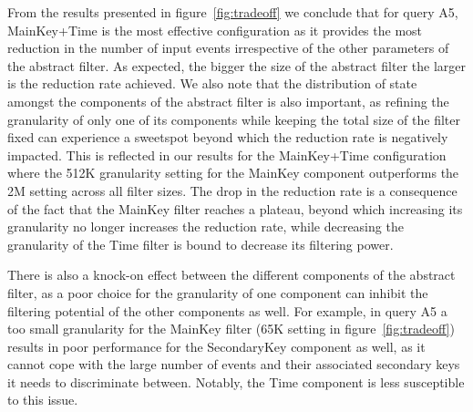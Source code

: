 From the results presented in figure~\ref{fig:tradeoff} we conclude that for
query A5, MainKey+Time is the most effective configuration as it provides the
most reduction in the number of input events irrespective of the other
parameters of the abstract filter. As expected, the bigger the size of the
abstract filter the larger is the reduction rate achieved.
We also note that the distribution of state amongst the components of the
abstract filter is also important, as refining the granularity of only one of
its components while keeping the total size of the filter fixed can experience a
sweetspot beyond which the reduction rate is negatively impacted.
This is reflected in our results for the MainKey+Time configuration where the
512K granularity setting for the MainKey component outperforms the 2M setting
across all filter sizes.
The drop in the reduction rate is a consequence of the fact that the MainKey
filter reaches a plateau, beyond which increasing its granularity no longer
increases the reduction rate, while decreasing the granularity of the Time
filter is bound to decrease its filtering power.

There is also a knock-on effect between the different components of the abstract
filter, as a poor choice for the granularity of one component can inhibit the
filtering potential of the other components as well.
For example, in query A5 a too small granularity for the MainKey filter (65K
setting in figure~\ref{fig:tradeoff}) results in poor performance for the
SecondaryKey component as well, as it cannot cope with the large number of
events and their associated secondary keys it needs to discriminate between.
Notably, the Time component is less susceptible to this issue. 






